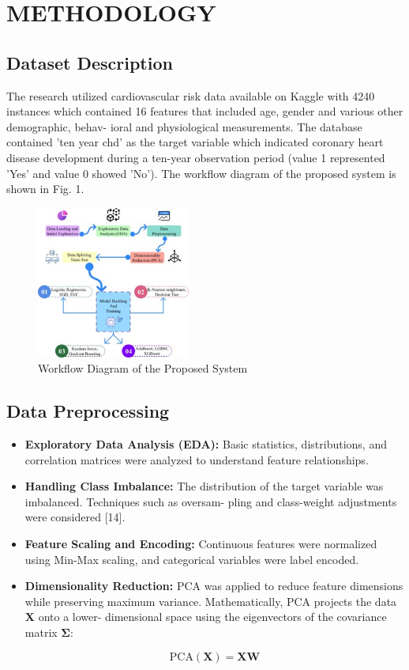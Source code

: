 \documentclass[conference]{IEEEtran}
\begin{document}
\section{METHODOLOGY}
\subsection{Dataset Description}
The research utilized cardiovascular risk data available on Kaggle with 4240 instances which contained 16 features that included age, gender and various other demographic, behav- ioral and physiological measurements. The database contained ’ten year chd’ as the target variable which indicated coronary heart disease development during a ten-year observation period (value 1 represented ’Yes’ and value 0 showed ’No’). The workflow diagram of the proposed system is shown in Fig. 1.

\begin{figure}[h!]
    \centering
    \includegraphics[width=0.45\textwidth]{Picture1.jpg}
    \caption{Workflow Diagram of the Proposed System}
    \label{fig:myphoto}
\end{figure}


\subsection{Data Preprocessing}\label{AA}
\begin{itemize}
\item \textbf{Exploratory Data Analysis (EDA):} Basic statistics, distributions, and correlation matrices were analyzed to understand feature relationships.
\item \textbf{Handling Class Imbalance:} The distribution of the target variable was imbalanced. Techniques such as oversam- pling and class-weight adjustments were considered [14].
\item \textbf{Feature Scaling and Encoding:} Continuous features were normalized using Min-Max scaling, and categorical variables were label encoded.
\item \textbf{Dimensionality Reduction:} PCA was applied to reduce feature dimensions while preserving maximum variance. Mathematically, PCA projects the data $\mathbf{X}$ onto a lower- dimensional space using the eigenvectors of the covariance matrix
$\mathbf{\Sigma}$:

\vspace{1em}

\begin{equation}
\text{PCA}(\mathbf{X}) = \mathbf{X}\mathbf{W} \label{eq:pca}
\end{equation}
\end{itemize}
\end{document}
